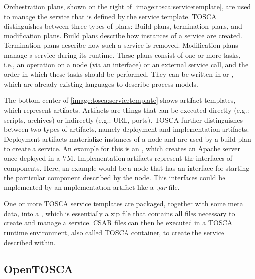 Orchestration plans, shown on the right of \autoref{image:tosca:servicetemplate}, are used to manage the service that is defined by the service template. TOSCA distinguishes between three types of plans: Build plans, termination plans, and modification plans.
Build plans describe how instances of a service are created.
Termination plans describe how such a service is removed.
Modification plans manage a service during its runtime.
These plans consist of one or more tasks, i.e., an operation on a node (via an interface) or an external service call, and the order in which these tasks should be performed.
They can be written in  or , which are already existing languages to describe process models.

The bottom center of \autoref{image:tosca:servicetemplate} shows artifact templates, which represent artifacts.
Artifacts are things that can be executed directly (e.g.: scripts, archives) or indirectly (e.g.: URL, ports).
TOSCA further distinguishes between two types of artifacts, namely deployment and implementation artifacts.
Deployment artifacts materialize instances of a node and are used by a build plan to create a service.
An example for this is an , which creates an Apache server once deployed in a VM.
Implementation artifacts represent the interfaces of components.
Here, an example would be a node that has an interface for starting the particular component described by the node.
This interfaces could be implemented by an implementation artifact like a \textit{.jar} file.

One or more TOSCA service templates are packaged, together with some meta data, into a , which is essentially a zip file that contains all files necessary to create and manage a service.
CSAR files can then be executed in a TOSCA runtime environment, also called TOSCA container, to create the service described within.

\subsection{OpenTOSCA}

